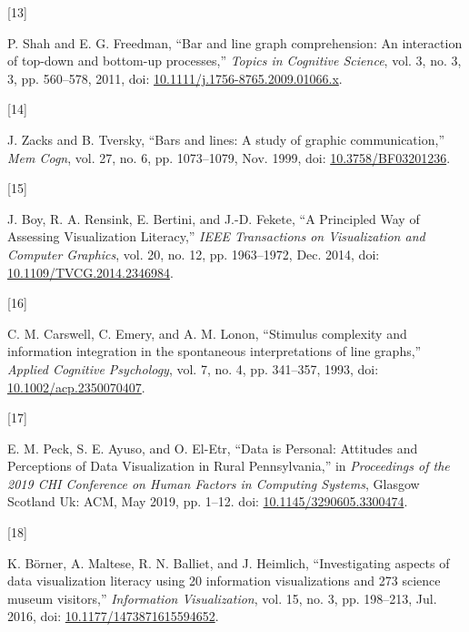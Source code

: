\documentclass{IEEEcsmag}
\newlength{\cslhangindent}
\newlength{\csllabelwidth}
\newenvironment{CSLReferences}[2] %
 {\begin{list}{}{%
  \setlength{\itemindent}{0pt}
  \setlength{\leftmargin}{0pt}
  \setlength{\parsep}{0pt}
  \ifodd #1
   \setlength{\leftmargin}{\cslhangindent}
   \setlength{\itemindent}{-1\cslhangindent}
  \fi
  \setlength{\itemsep}{#2\baselineskip}}}
 {\end{list}}
\newcommand{\CSLLeftMargin}[1]{\parbox[t]{\csllabelwidth}{#1}}
\newcommand{\CSLRightInline}[1]{\parbox[t]{\linewidth - \csllabelwidth}{#1}\break}
\begin{document}
\begin{CSLReferences}{0}{0}
\CSLLeftMargin{{[}13{]} }%
\CSLRightInline{P. Shah and E. G. Freedman, {``Bar and line graph comprehension: {An} interaction of top-down and bottom-up processes,''} \emph{Topics in Cognitive Science}, vol. 3, no. 3, 3, pp. 560--578, 2011, doi: \href{https://doi.org/10.1111/j.1756-8765.2009.01066.x}{10.1111/j.1756-8765.2009.01066.x}.}

\CSLLeftMargin{{[}14{]} }%
\CSLRightInline{J. Zacks and B. Tversky, {``Bars and lines: {A} study of graphic communication,''} \emph{Mem Cogn}, vol. 27, no. 6, pp. 1073--1079, Nov. 1999, doi: \href{https://doi.org/10.3758/BF03201236}{10.3758/BF03201236}.}

\CSLLeftMargin{{[}15{]} }%
\CSLRightInline{J. Boy, R. A. Rensink, E. Bertini, and J.-D. Fekete, {``A {Principled} {Way} of {Assessing} {Visualization} {Literacy},''} \emph{IEEE Transactions on Visualization and Computer Graphics}, vol. 20, no. 12, pp. 1963--1972, Dec. 2014, doi: \href{https://doi.org/10.1109/TVCG.2014.2346984}{10.1109/TVCG.2014.2346984}.}

\CSLLeftMargin{{[}16{]} }%
\CSLRightInline{C. M. Carswell, C. Emery, and A. M. Lonon, {``Stimulus complexity and information integration in the spontaneous interpretations of line graphs,''} \emph{Applied Cognitive Psychology}, vol. 7, no. 4, pp. 341--357, 1993, doi: \href{https://doi.org/10.1002/acp.2350070407}{10.1002/acp.2350070407}.}

\CSLLeftMargin{{[}17{]} }%
\CSLRightInline{E. M. Peck, S. E. Ayuso, and O. El-Etr, {``Data is {Personal}: {Attitudes} and {Perceptions} of {Data} {Visualization} in {Rural} {Pennsylvania},''} in \emph{Proceedings of the 2019 {CHI} {Conference} on {Human} {Factors} in {Computing} {Systems}}, Glasgow Scotland Uk: ACM, May 2019, pp. 1--12. doi: \href{https://doi.org/10.1145/3290605.3300474}{10.1145/3290605.3300474}.}

\CSLLeftMargin{{[}18{]} }%
\CSLRightInline{K. Börner, A. Maltese, R. N. Balliet, and J. Heimlich, {``Investigating aspects of data visualization literacy using 20 information visualizations and 273 science museum visitors,''} \emph{Information Visualization}, vol. 15, no. 3, pp. 198--213, Jul. 2016, doi: \href{https://doi.org/10.1177/1473871615594652}{10.1177/1473871615594652}.}


\end{CSLReferences}
\end{document}
